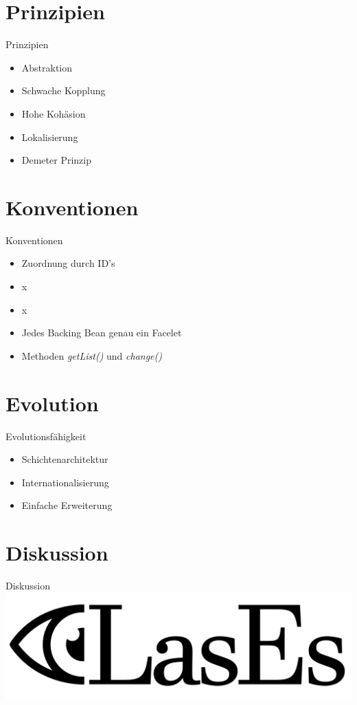 \documentclass{beamer}
\begin{document}
    \section{Prinzipien}

    \begin{frame}{Prinzipien}
        \begin{itemize}
            \item Abstraktion \pause
            \item Schwache Kopplung \pause
            \item Hohe Kohäsion \pause
            \item Lokalisierung \pause
            \item Demeter Prinzip
        \end{itemize}
    \end{frame}


    \section{Konventionen}
    \begin{frame}{Konventionen}
        \pause
        \begin{itemize}
            \item Zuordnung durch ID's
            \item x 
            \item x \textrightarrow * \pause
            \item Jedes Backing Bean genau ein Facelet \pause
            \item Methoden \emph{getList()} und \emph{change()}
        \end{itemize}
    \end{frame}



    \section{Evolution}
    \begin{frame}{Evolutionsfähigkeit}
        \begin{itemize}
            \item Schichtenarchitektur
            \item Internationalisierung
            \item Einfache Erweiterung
        \end{itemize}
    \end{frame}

    \section{Diskussion}
    \begin{frame}{Diskussion}
        \includegraphics[width=\textwidth]{../../docs/Pflichtenheft/graphics/LasEs-logo}
    \end{frame}
\end{document}

